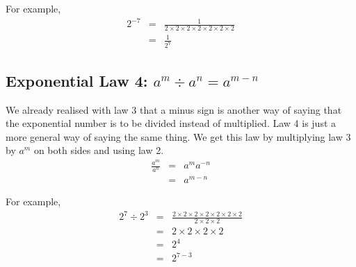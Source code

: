 \documentclass[10pt,a4paper,titlepage,twoside,openright]{report}
\begin{document}
For example,
\begin{eqnarray*}
2^{-7}&=&\frac{1}{2\times 2\times 2\times 2\times 2\times 2\times 2}\\
&=&\frac{1}{2^{7}}
\end{eqnarray*}


\subsection{Exponential Law 4: $a^m \div a^n=a^{m-n}$}
We already realised with law 3 that a minus sign is another way of saying that the exponential number is to be divided instead of multiplied. Law 4 is just a more general way of saying the same thing. We get this law by  multiplying law 3 by $a^m$ on both sides and using law 2.
\begin{eqnarray}
\label{eq:mn:e:law4:proof}
\frac {a^m}{a^n}&=&a^ma^{-n}\\\nonumber
&=&a^{m-n}
\end{eqnarray}

For example,
\begin{eqnarray*}
2^7 \div 2^3&=&\frac{2\times 2\times 2\times 2\times 2\times 2\times 2}{2\times 2\times 2}\\
&=&2\times 2\times 2\times 2\\
&=&2^{4}\\
&=&2^{7-3}
\end{eqnarray*}

\end{document}

